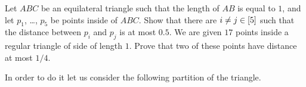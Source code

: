 \begin{chapterendexercises}
  \exercise Let $ABC$ be an equilateral triangle such that the length of $AB$ is
    equal to $1$, and let $p_1$, \dots, $p_5$ be points inside of $ABC$.
    Show that there are $i \neq j \in {[{5}]}$ such that the distance between 
    $p_i$ and $p_j$ is at most $0.5$.
  \exercise We are given $17$ points inside a regular triangle of side of
    length $1$. Prove that two of these points have distance at most $1 / 4$.
    \begin{solution}
      In order to do it let us consider the following partition of the triangle.

      \begin{center}
      \end{center}


\end{solution}
\end{chapterendexercises}
